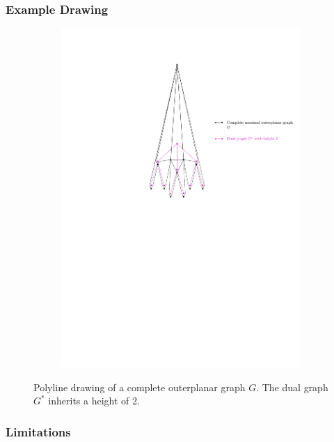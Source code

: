 \subsubsection{Example Drawing}

	\begin{figure}[H]
	\centering
	\begin{subfigure}{\textwidth}
		\centering
		\includegraphics[page=1,width=0.7\linewidth]{graphics/complete_maximal_outerplanar_weak_dual_graph_example_drawing.pdf}
	\end{subfigure}
	\caption{Polyline drawing of a complete outerplanar graph $G$. The dual graph $G^*$ inherits a height of 2.}
\end{figure}


\subsubsection{Limitations}

